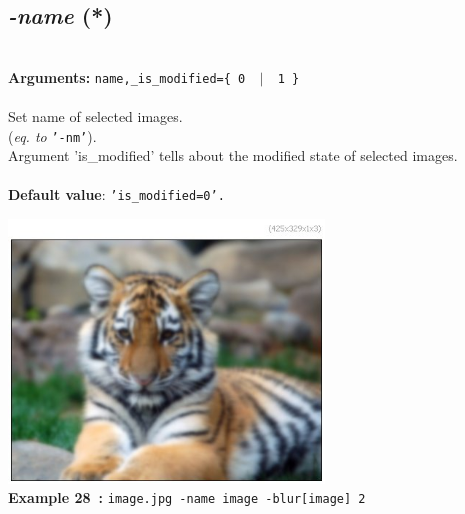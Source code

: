 \documentclass[a4paper,11pt,twoside]{book}
\begin{document}
\subsection{\emph{-name} (*)}\vspace*{-0.5em}
~\\\textbf{Arguments: } 
{\small \texttt{name,\_is\_modified=\{ 0 ~$|$~ 1 \}}}\\~\\
Set name of selected images.
~\\(\emph{eq. to} {\small \texttt{'-nm'}}).
~\\Argument 'is\_modified' tells about the modified state of selected images.
~\\~\\\textbf{Default value}: {\small \texttt{'is\_modified=0'.}}
\begin{center}\includegraphics[keepaspectratio=true,height=7cm,width=\textwidth]{img/gmic_def28.jpg}\\
{\footnotesize \textbf{Example 28~:} \texttt{image.jpg -name image -blur[image] 2}}
\end{center}
\end{document}
